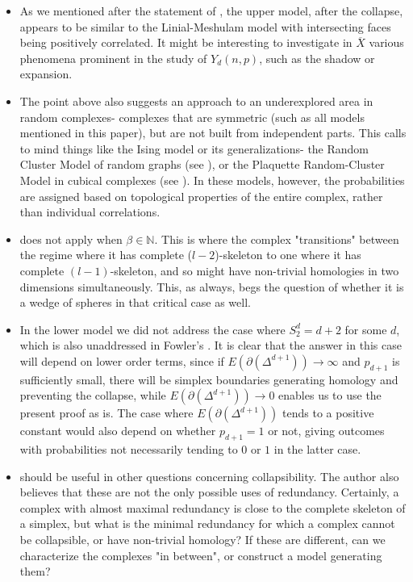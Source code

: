 \documentclass{article}
\theoremstyle{plain}
\theoremstyle{definition}
\theoremstyle{remark}
\newcommand{\N}{\mathbb{N}}
\newcommand{\di}{dimension}
\begin{document}
\begin{itemize}
    \item As we mentioned after the statement of , the upper model, after the collapse, appears to be similar to the Linial-Meshulam model with intersecting faces being positively correlated.
    It might be interesting to investigate in $\overline{X}$ various phenomena prominent in the study of $Y_d(n,p)$, such as the shadow or expansion.
    \item The point above also suggests an approach to an underexplored area in random complexes- complexes that are symmetric (such as all models mentioned in this paper), but are not built from independent parts. 
    This calls to mind things like the Ising model or its generalizations- the Random Cluster Model of random graphs (see \cite{FortuinKasteleyn72}), or the Plaquette Random-Cluster Model in cubical complexes (see \cite{DuncanSchweinhart25}). In these models, however, the probabilities are assigned based on topological properties of the entire complex, rather than individual correlations.
    \item  {} does not apply when $\beta\in \N$. This is where the complex "transitions" between the regime where it has complete ($l-2$)-skeleton to one where it has complete $(l-1)$-skeleton, and so might have non-trivial homologies in two \di s simultaneously. 
    This, as always, begs the question of whether it is a wedge of spheres in that critical case as well.
    \item In the lower model we did not address the case where $S_2^d=d+2$ for some $d$, which is also unaddressed in Fowler's . 
    It is clear that the answer in this case will depend on lower order terms, since if $E(\partial(\Delta^{d+1}))\to \infty$ and $p_{d+1}$ is sufficiently small, there will be simplex boundaries generating homology and preventing the collapse, while $E(\partial(\Delta^{d+1}))\to 0$ enables us to use the present proof as is.
    The case where $E(\partial(\Delta^{d+1}))$ tends to a positive constant would also depend on whether $p_{d+1}=1$ or not, giving outcomes with probabilities not necessarily tending to $0$ or $1$ in the latter case.
    \item {} should be useful in other questions concerning collapsibility. The author also believes that these are not the only possible uses of redundancy. Certainly, a complex with almost maximal redundancy is close to the complete skeleton of a simplex, but what is the minimal redundancy for which a complex cannot be collapsible, or have non-trivial homology? If these are different, can we characterize the complexes "in between", or construct a model generating them?
\end{itemize}

\printbibliography
\end{document}
